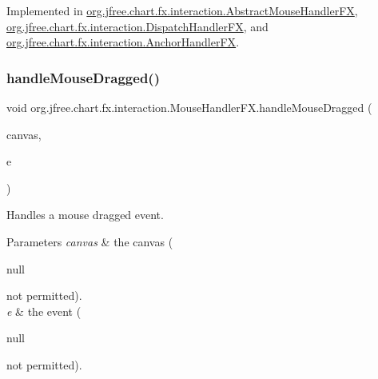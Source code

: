 Implemented in \mbox{\hyperlink{classorg_1_1jfree_1_1chart_1_1fx_1_1interaction_1_1_abstract_mouse_handler_f_x_a844c908ba8528b4f0a1afb139fd9cd36}{org.\+jfree.\+chart.\+fx.\+interaction.\+Abstract\+Mouse\+Handler\+FX}}, \mbox{\hyperlink{classorg_1_1jfree_1_1chart_1_1fx_1_1interaction_1_1_dispatch_handler_f_x_a9a58cb60ccd2dba2c76b19f91fe7d55a}{org.\+jfree.\+chart.\+fx.\+interaction.\+Dispatch\+Handler\+FX}}, and \mbox{\hyperlink{classorg_1_1jfree_1_1chart_1_1fx_1_1interaction_1_1_anchor_handler_f_x_a1eb3a7adc3693b4a6160032ceb539bb7}{org.\+jfree.\+chart.\+fx.\+interaction.\+Anchor\+Handler\+FX}}.

\mbox{\label{interfaceorg_1_1jfree_1_1chart_1_1fx_1_1interaction_1_1_mouse_handler_f_x_a06bbfd28b778bca8ef8caf90174e18f4}} 
\subsubsection{\texorpdfstring{handle\+Mouse\+Dragged()}{handleMouseDragged()}}
{\footnotesize\ttfamily void org.\+jfree.\+chart.\+fx.\+interaction.\+Mouse\+Handler\+F\+X.\+handle\+Mouse\+Dragged (\begin{DoxyParamCaption}\item[{\mbox{\hyperlink{classorg_1_1jfree_1_1chart_1_1fx_1_1_chart_canvas}{Chart\+Canvas}}}]{canvas,  }\item[{Mouse\+Event}]{e }\end{DoxyParamCaption})}

Handles a mouse dragged event.


\begin{DoxyParams}{Parameters}
{\em canvas} & the canvas (
\begin{DoxyCode}
null 
\end{DoxyCode}
 not permitted). \\
\hline
{\em e} & the event (
\begin{DoxyCode}
null 
\end{DoxyCode}
 not permitted). \\
\hline
\end{DoxyParams}


